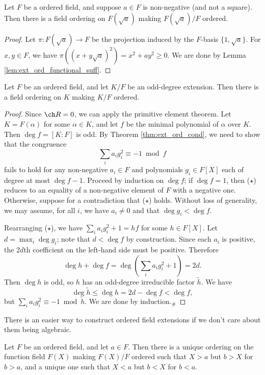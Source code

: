 \begin{corollary}
  \label{cor:ext_ord_to_adj_sqrt}
  Let $F$ be a ordered field, and suppose $a\in F$ is non-negative (and not a square). Then there is a field ordering on $F(\sqrt{a})$ making $F(\sqrt{a})/F$ ordered.
\end{corollary}
\begin{proof}
  Let $\pi:F(\sqrt{a})\to F$ be the projection induced by the $F$-basis $\{1,\sqrt{a}\}$. For $x,y\in F$, we have $\pi((x+y\sqrt{a})^2)=x^2+ay^2\geq0$. We are done by Lemma \ref{lem:ext_ord_functional_suff}.
\end{proof}

\begin{lemma}
  \label{lem:ext_ord_odd_deg}
  Let $F$ be an ordered field, and let $K/F$ be an odd-degree extension. Then there is a field ordering on $K$ making $K/F$ ordered.
\end{lemma}
\begin{proof}
  Since $\ch R=0$, we can apply the primitive element theorem. Let $K=F(\alpha)$ for some $\alpha\in K$, and let $f$ be the minimal polynomial of $\alpha$ over $K$. Then $\deg f=[K:F]$ is odd. By Theorem \ref{thm:ext_ord_cond}, we need to show that the congruence
  \[\sum_ia_ig_i^2\equiv-1\bmod f\tag{$\star$}\]
  fails to hold for any non-negative $a_i\in F$ and polynomials $g_i\in F[X]$ each of degree at most $\deg f-1$. Proceed by induction on $\deg f$; if $\deg f=1$, then ($\star$) reduces to an equality of a non-negative element of $F$ with a negative one. Otherwise, suppose for a contradiction that ($\star$) holds. Without loss of generality, we may assume, for all $i$, we have $a_i\neq0$ and that $\deg g_i<\deg f$.
  
  Rearranging ($\star$), we have $\sum_ia_ig_i^2+1=hf$ for some $h\in F[X]$. Let $d=\max_i\deg g_i$; note that $d<\deg f$ by construction. Since each $a_i$ is positive, the $2d$th coefficient on the left-hand side must be positive. Therefore
  \[\deg h+\deg f=\deg\left(\sum_ia_ig_i^2+1\right)=2d.\]
  Then $\deg h$ is odd, so $h$ has an odd-degree irreducible factor $\tilde h$. We have
  \[\deg\tilde h\leq\deg h=2d-\deg f<\deg f,\]
  but $\sum_ia_ig_i^2\equiv-1\bmod\tilde h$. We are done by induction.$_\#$
\end{proof}

There is an easier way to construct ordered field extensions if we don't care about them being algebraic.

\begin{lemma}
  \label{lem:order_fun_field}
  Let $F$ be an ordered field, and let $a\in F$. Then there is a unique ordering on the function field $F(X)$ making $F(X)/F$ ordered such that $X>a$ but $b>X$ for $b>a$, and a unique one such that $X<a$ but $b<X$ for $b<a$.
\end{lemma}

